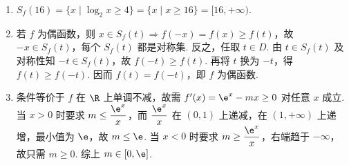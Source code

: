 \documentclass[UTF8,a4paper,oneside,11pt]{ctexbook}
\begin{document}
\begin{solution}
\begin{enumerate}
\item \(S_f(16)=\{x\mid\log_2x\ge4\}=\{x\mid x\ge16\}=[16,+\infty)\).
\item 若 \(f\) 为偶函数，则 \(x\in S_f(t)\Rightarrow f(-x)=f(x)\ge f(t)\)，故 \(-x\in S_f(t)\)，每个 \(S_f(t)\) 都是对称集. 反之，任取 \(t\in D\). 由 \(t\in S_f(t)\) 及对称性知 \(-t\in S_f(t)\)，故 \(f(-t)\ge f(t)\). 再将 \(t\) 换为 \(-t\)，得 \(f(t)\ge f(-t)\). 因而 \(f(t)=f(-t)\)，即 \(f\) 为偶函数.
\item 条件等价于 \(f\) 在 \(\R\) 上单调不减，故需 \(f'(x)=\e^x-mx\ge0\) 对任意 \(x\) 成立. 当 \(x>0\) 时要求 \(m\le\dfrac{\e^x}{x}\)，而 \(\dfrac{\e^x}{x}\) 在 \((0,1)\) 上递减，在 \((1,+\infty)\) 上递增，最小值为 \(\e\)，故 \(m\le\e\). 当 \(x<0\) 时要求 \(m\ge\dfrac{\e^x}{x}\)，右端趋于 \(-\infty\)，故只需 \(m\ge0\). 综上 \(m\in[0,\e]\).
\end{enumerate}
\end{solution}

\end{document}

